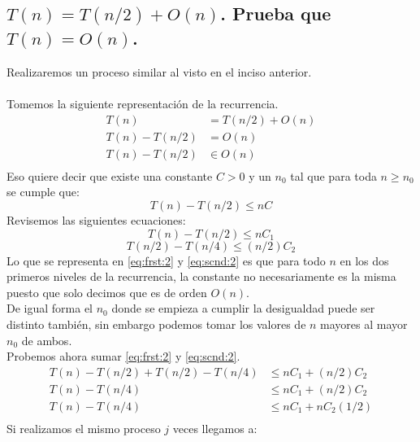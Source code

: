 \documentclass[12pt]{article}
\begin{document}
\subsection{$T(n)=T(n/2) + O(n)$. Prueba que $T(n)=O(n)$.}
Realizaremos un proceso similar al visto en el inciso anterior.\\
\paragraph{} Tomemos la siguiente representación de la recurrencia.
\begin{equation}
\begin{split}
T(n) & =T(n/2) + O(n) \\
T(n) - T(n/2) & = O(n) \\
T(n) - T(n/2) & \in O(n) \\
\end{split}
\end{equation}
Eso quiere decir que existe una constante $C>0$ y un $n_0$ tal que para toda  $n\geq n_0$ se cumple que:
\begin{equation}
T(n)-T(n/2) \leq nC
\end{equation}
Revisemos las siguientes ecuaciones:
\begin{equation}\label{eq:frst:2}
T(n)-T(n/2) \leq nC_1
\end{equation}
\begin{equation}\label{eq:scnd:2}
T(n/2)-T(n/4) \leq (n/2)C_2
\end{equation}
Lo que se representa en \eqref{eq:frst:2} y \eqref{eq:scnd:2} es que para todo $n$ en los dos primeros niveles de la recurrencia, la constante no necesariamente es la misma puesto que solo decimos que es de orden $O(n)$.\\
De igual forma el $n_0$ donde se empieza a cumplir la desigualdad puede ser distinto también, sin embargo podemos tomar los valores de $n$ mayores al mayor $n_0$ de ambos.\\
Probemos ahora sumar \eqref{eq:frst:2} y \eqref{eq:scnd:2}.
\begin{equation}\label{eq:thrd:2}
\begin{split}
T(n)-T(n/2) + T(n/2) - T(n/4) & \leq nC_1 + (n/2)C_2 \\
T(n) - T(n/4) & \leq nC_1 + (n/2)C_2 \\
T(n) - T(n/4) & \leq nC_1 + nC_2(1/2) \\
\end{split}
\end{equation}
Si realizamos el mismo proceso $j$ veces llegamos a:
\end{document}

